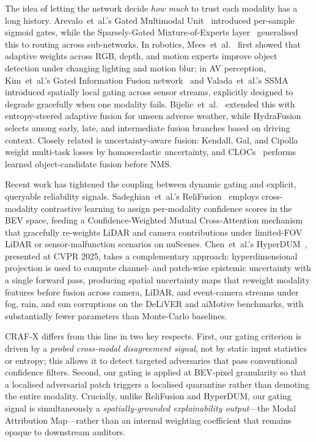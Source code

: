 The idea of letting the network decide \emph{how much} to trust each
modality has a long history. Arevalo~et~al.'s Gated Multimodal
Unit~\cite{ArevaloGMU2017} introduced per-sample sigmoid gates, while
the Sparsely-Gated Mixture-of-Experts
layer~\cite{ShazeerMoE2017} generalised this to routing across
sub-networks. In robotics, Mees~et~al.~\cite{MeesIROS2016} first showed
that adaptive weights across RGB, depth, and motion experts improve
object detection under changing lighting and motion blur; in AV
perception, Kim~et~al.'s Gated Information Fusion
network~\cite{KimGIF2018} and Valada~et~al.'s
SSMA~\cite{ValadaSSMA2020} introduced spatially local gating across
sensor streams, explicitly designed to degrade gracefully when one
modality fails. Bijelic~et~al.~\cite{BijelicFog2020} extended this with
entropy-steered adaptive fusion for unseen adverse weather, while
HydraFusion~\cite{MalawadeHydra2022} selects among early, late, and
intermediate fusion branches based on driving context.
Closely related is uncertainty-aware fusion: Kendall, Gal, and
Cipolla~\cite{KendallMTL2018} weight multi-task losses by homoscedastic
uncertainty, and CLOCs~\cite{PangCLOCs2020} performs learned
object-candidate fusion before NMS.

Recent work has tightened the coupling between dynamic gating and
explicit, queryable reliability signals. Sadeghian~et~al.'s
ReliFusion~\cite{SadeghianReliFusion2025} employs cross-modality
contrastive learning to assign per-modality confidence scores in the
BEV space, feeding a Confidence-Weighted Mutual Cross-Attention
mechanism that gracefully re-weights LiDAR and camera contributions
under limited-FOV LiDAR or sensor-malfunction scenarios on nuScenes.
Chen~et~al.'s HyperDUM~\cite{ChenHyperDUM2025}, presented at CVPR 2025,
takes a complementary approach: hyperdimensional projection is used to
compute channel- and patch-wise epistemic uncertainty with a single
forward pass, producing spatial uncertainty maps that reweight modality
features before fusion across camera, LiDAR, and event-camera streams
under fog, rain, and sun corruptions on the DeLiVER and aiMotive benchmarks,
with substantially fewer parameters than Monte-Carlo baselines.

CRAF-X differs from this line in two key respects. First, our gating
criterion is driven by a \emph{probed cross-modal disagreement signal},
not by static input statistics or entropy; this allows it to detect
targeted adversaries that pass conventional confidence filters.
Second, our gating is applied at BEV-pixel granularity so that a
localised adversarial patch triggers a localised quarantine rather than
demoting the entire modality. Crucially, unlike ReliFusion and HyperDUM,
our gating signal is simultaneously a \emph{spatially-grounded
explainability output}---the Modal Attribution Map---rather than an
internal weighting coefficient that remains opaque to downstream auditors.


